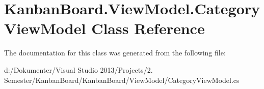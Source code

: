 \hypertarget{class_kanban_board_1_1_view_model_1_1_category_view_model}{}\section{Kanban\+Board.\+View\+Model.\+Category\+View\+Model Class Reference}
\label{class_kanban_board_1_1_view_model_1_1_category_view_model}


The documentation for this class was generated from the following file\+:\begin{DoxyCompactItemize}
\item 
d\+:/\+Dokumenter/\+Visual Studio 2013/\+Projects/2. Semester/\+Kanban\+Board/\+Kanban\+Board/\+View\+Model/Category\+View\+Model.\+cs\end{DoxyCompactItemize}
